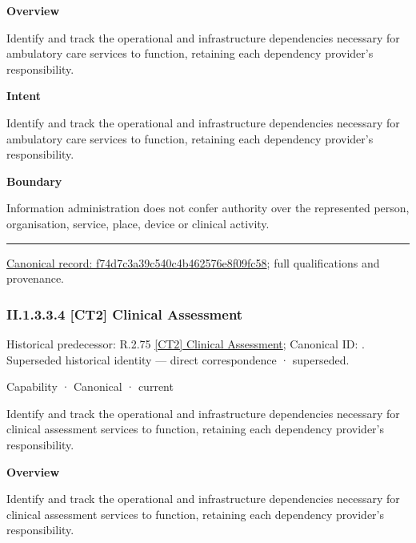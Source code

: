 \textbf{Overview}



Identify and track the operational and infrastructure dependencies necessary for ambulatory care services to function, retaining each dependency provider's responsibility.



\textbf{Intent}



Identify and track the operational and infrastructure dependencies necessary for ambulatory care services to function, retaining each dependency provider's responsibility.



\textbf{Boundary}



Information administration does not confer authority over the represented person, organisation, service, place, device or clinical activity.



\medskip\hrule\medskip

{\footnotesize \href{../../../../continuum/strategy/capability/f74d7c3a39c540c4b462576e8f09fc58.md}{Canonical record: f74d7c3a39c540c4b462576e8f09fc58}; full qualifications and provenance.}\par
\subsubsection*{II.1.3.3.4 [CT2] Clinical Assessment}
\label{navigation:II.1.3.3.4}

{\small Historical predecessor: R.2.75 \hyperref[element:1c3b553c87704e27ba211fbbd02d95cb]{[CT2] Clinical Assessment}; Canonical ID: \texttt{}. Superseded historical identity — direct correspondence · superseded.}\par
\label{element:a7d84c95e48c453797419813ca80a66c}
{\small Capability · Canonical · current}\par

Identify and track the operational and infrastructure dependencies necessary for clinical assessment services to function, retaining each dependency provider's responsibility.



\textbf{Overview}



Identify and track the operational and infrastructure dependencies necessary for clinical assessment services to function, retaining each dependency provider's responsibility.



